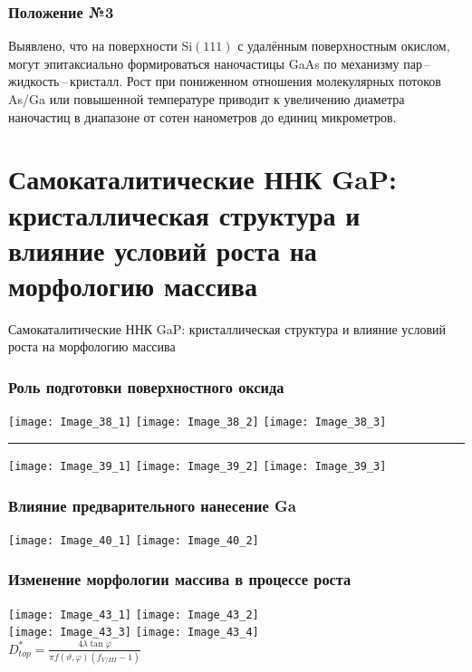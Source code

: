 \begin{frame}
	\frametitle{Положение №3}
	\large
Выявлено, что на поверхности Si\((111)\) с удалённым поверхностным окислом,
могут эпитаксиально формироваться наночастицы GaAs по механизму
пар\,--\,жидкость\,--\,кристалл. Рост при пониженном отношения молекулярных
потоков As/Ga или повышенной температуре приводит к увеличению диаметра
наночастиц в диапазоне от сотен нанометров до единиц микрометров.
\end{frame}

\section{Самокаталитические ННК GaP: кристаллическая структура и влияние условий роста на морфологию массива}

\begin{frame}
	\begin{center}
		\Huge
		Самокаталитические ННК GaP: кристаллическая структура и влияние условий роста на морфологию массива
	\end{center}
\end{frame}

\begin{frame}
	\frametitle{Роль подготовки поверхностного оксида}
	\centering
	\hfill
	\texttt{[image: Image\_38\_1]}
	\hfill
	\texttt{[image: Image\_38\_2]}
	\hfill
	\texttt{[image: Image\_38\_3]}
	\hfill
	\bigskip
	\hrule{}
	\bigskip
	\hfill
	\texttt{[image: Image\_39\_1]}
	\hfill
	\texttt{[image: Image\_39\_2]}
	\hfill
	\texttt{[image: Image\_39\_3]}
	\hfill
\end{frame}

\begin{frame}
	\frametitle{Влияние предварительного нанесение Ga}
	\centering
	\texttt{[image: Image\_40\_1]}
	\texttt{[image: Image\_40\_2]}
\end{frame}


\begin{frame}
	\frametitle{Изменение морфологии массива в процессе роста}
	\centering
	\texttt{[image: Image\_43\_1]}
	\texttt{[image: Image\_43\_2]}
	\\
	\texttt{[image: Image\_43\_3]}
	\texttt{[image: Image\_43\_4]}
	\\[5pt]
	\(D_{top}^\ast=\frac{4 \lambda \tan{\varphi}}{\pi f(\vartheta,\varphi)(f_{V/III}-1)}\)
\end{frame}


